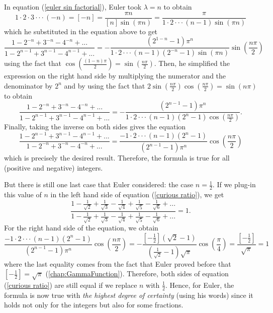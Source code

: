 In equation (\ref{euler sin factorial}), Euler took $\lambda = n$ to obtain
$$1\cdot 2 \cdot 3 \cdot \cdot \cdot (-n) = [-n] = \frac{\pi n}{[n] \sin(\pi n)} = \frac{\pi}{1\cdot 2 \cdot \cdot \cdot (n-1) \sin(\pi n)}$$
which he substituted in the equation above to get
$$\frac{1 - 2^{-n} + 3^{-n} - 4^{-n}+ ...}{\displaystyle 1 - 2^{n-1} +  3^{n-1} - 4^{n-1}  + ...} = -\frac{(2^{1-n} - 1)\pi^n}{1\cdot 2 \cdot \cdot \cdot (n - 1)(2^{-n} - 1)\sin(\pi n)}\sin \left(\frac{n\pi }{2}\right)$$
using the fact that $\cos(\frac{(1-n)\pi}{2}) = \sin(\frac{n\pi}{2})$. Then, he simplified the expression on the right hand side by multiplying the numerator and the denominator by $2^n$ and by using the fact that $2 \sin(\frac{n\pi}{2})\cos(\frac{n\pi}{2}) = \sin(n\pi)$ to obtain
$$\frac{1 - 2^{-n} + 3^{-n} - 4^{-n}+ ...}{\displaystyle 1 - 2^{n-1} +  3^{n-1} - 4^{n-1}  + ...} = -\frac{(2^{n-1} - 1)\pi^n}{1\cdot 2 \cdot \cdot \cdot (n - 1)(2^{n} - 1)\cos \left(\frac{n\pi }{2}\right)}.$$
Finally, taking the inverse on both sides gives the equation 
$$\frac{\displaystyle 1 - 2^{n-1} +  3^{n-1} - 4^{n-1}  + ...}{1 - 2^{-n} + 3^{-n} - 4^{-n}+ ...} = \frac{-1\cdot 2 \cdot \cdot \cdot (n - 1)(2^{n} - 1)}{(2^{n-1} - 1)\pi^n}\cos \left(\frac{n\pi }{2}\right)$$
which is precisely the desired result. Therefore, the formula is true for all (positive and negative) integers. 

But there is still one last case that Euler considered: the case $n = \frac{1}{2}$. If we plug-in this value of $n$ in the left hand side of equation (\ref{curious ratio}), we get
$$\frac{1 - \frac{1}{\sqrt{2}} + \frac{1}{\sqrt{3}} - \frac{1}{\sqrt{4}} + \frac{1}{\sqrt{5}} - \frac{1}{\sqrt{6}} + ...}{1 - \frac{1}{\sqrt{2}} + \frac{1}{\sqrt{3}} - \frac{1}{\sqrt{4}} + \frac{1}{\sqrt{5}} - \frac{1}{\sqrt{6}} + ...} = 1.$$
For the right hand side of the equation, we obtain
$$\frac{-1\cdot 2 \cdot \cdot \cdot (n - 1)(2^{n} - 1)}{(2^{n-1} - 1)\pi^n}\cos \left(\frac{n\pi }{2}\right) = -\frac{[-\frac{1}{2}](\sqrt{2} - 1)}{(\frac{1}{\sqrt{2}} - 1)\sqrt{\pi}}\cos \left(\frac{\pi }{4}\right) = \frac{[-\frac{1}{2}]}{\sqrt{\pi}} = 1$$
where the last equality comes from the fact that Euler proved before that $[-\frac{1}{2}] = \sqrt{\pi}$ (\autoref{chap:GammaFunction}). Therefore, both sides of equation (\ref{curious ratio}) are still equal if we replace $n$ with $\frac{1}{2}$. Hence, for Euler, the formula is now true with \textit{the highest degree of certainty} (using his words) since it holds not only for the integers but also for some fractions.

